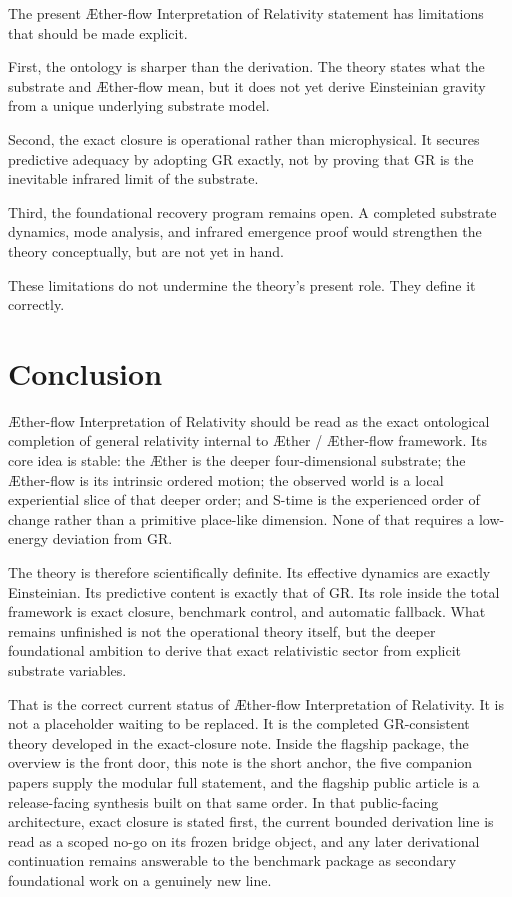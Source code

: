\documentclass[11pt]{article}
\newcommand{\Aether}{\AE{}ther}
\newcommand{\Aflow}{\AE{}ther-flow}
\newcommand{\TheoryName}{\Aflow{} Interpretation of Relativity}
\newcommand{\TheoryProgram}{\Aether{} / \Aflow{} framework}
\begin{document}
The present \TheoryName{} statement has limitations that should be made explicit.

First, the ontology is sharper than the derivation. The theory states what the substrate and \Aflow{} mean, but it does not yet derive Einsteinian gravity from a unique underlying substrate model.

Second, the exact closure is operational rather than microphysical. It secures predictive adequacy by adopting GR exactly, not by proving that GR is the inevitable infrared limit of the substrate.

Third, the foundational recovery program remains open. A completed substrate dynamics, mode analysis, and infrared emergence proof would strengthen the theory conceptually, but are not yet in hand.

These limitations do not undermine the theory's present role. They define it correctly.

\section{Conclusion}

\TheoryName{} should be read as the exact ontological completion of general relativity internal to \TheoryProgram{}. Its core idea is stable: the \Aether{} is the deeper four-dimensional substrate; the \Aflow{} is its intrinsic ordered motion; the observed world is a local experiential slice of that deeper order; and S-time is the experienced order of change rather than a primitive place-like dimension. None of that requires a low-energy deviation from GR.

The theory is therefore scientifically definite. Its effective dynamics are exactly Einsteinian. Its predictive content is exactly that of GR. Its role inside the total framework is exact closure, benchmark control, and automatic fallback. What remains unfinished is not the operational theory itself, but the deeper foundational ambition to derive that exact relativistic sector from explicit substrate variables.

That is the correct current status of \TheoryName{}. It is not a placeholder waiting to be replaced. It is the completed GR-consistent theory developed in the exact-closure note. Inside the flagship package, the overview is the front door, this note is the short anchor, the five companion papers supply the modular full statement, and the flagship public article is a release-facing synthesis built on that same order. In that public-facing architecture, exact closure is stated first, the current bounded derivation line is read as a scoped no-go on its frozen bridge object, and any later derivational continuation remains answerable to the benchmark package as secondary foundational work on a genuinely new line.
\end{document}

